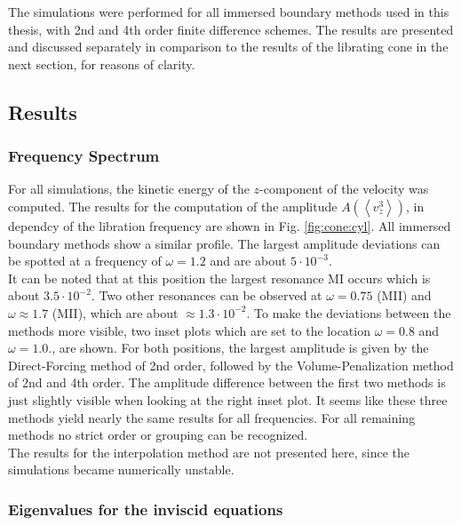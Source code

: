 The simulations were performed for all immersed boundary methods used in this thesis, with 2nd and 4th order finite difference schemes.
The results are presented and discussed separately in comparison to the results of the librating cone in the next section, for reasons of clarity.

\clearpage


\subsection{Results}
\subsubsection{Frequency Spectrum}

For all simulations, the kinetic energy of the $z$-component of the velocity was computed.
The results for the computation of the amplitude $A\left(\left<v_z^3\right>\right)$, in dependcy of the libration
frequency are shown in Fig. \ref{fig:cone:cyl}.
All immersed boundary methods show a similar profile.
The largest amplitude deviations can be spotted at a frequency of $\omega=1.2$ and are about $5\cdot10^{-3}$.\\
It can be noted that at this position the largest resonance M\RN{1} occurs which is about $3.5\cdot10^{-2}$.
Two other resonances can be observed at $\omega=0.75$ (M\RN{2}) and $\omega\approx1.7$ (M\RN{2}), which are
about ${\approx1.3\cdot10^{-2}}$.
To make the deviations between the methods more visible, two inset plots which are
set to the location $\omega=0.8$ and $\omega=1.0$., are shown.
For both positions, the largest amplitude is given by the Direct-Forcing method of 2nd order, followed by
the Volume-Penalization method of 2nd and 4th order.
The amplitude difference between the first two methods is just slightly visible when looking at the right inset plot.
It seems like these three methods yield nearly the same results for all frequencies.
For all remaining methods  no strict order or grouping can be recognized.\\
The results for the interpolation method are not presented here, since the simulations became numerically unstable.

\subsubsection{Eigenvalues for the inviscid equations}


